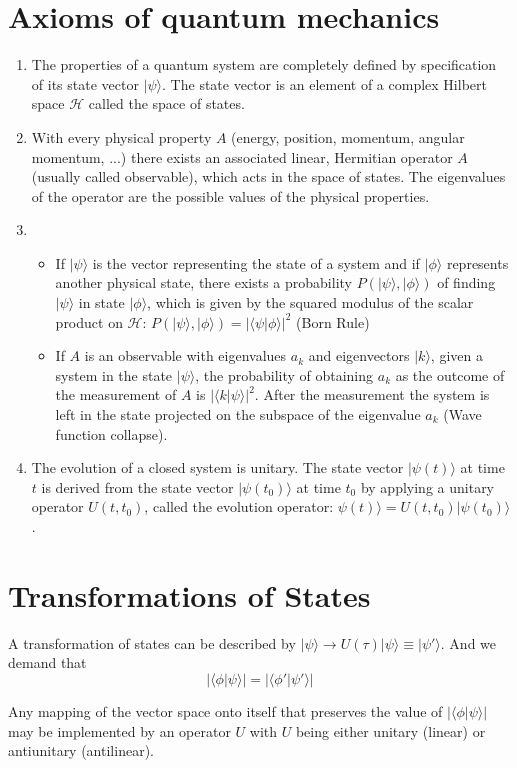 \section{Axioms of quantum mechanics}
\begin{enumerate}
\item  The properties of a quantum system are completely defined by specification of its state vector $|\psi\rangle$. The state vector is an element of a complex Hilbert space $\mathcal{H}$ called the space of states.
\item With every physical property $A$ (energy, position, momentum, angular momentum, ...) there exists an associated linear, Hermitian operator $A$ (usually called observable), which acts in the space of states. The eigenvalues of the operator are the possible values of the physical properties.
\item 
\begin{itemize}
\item  If $|\psi\rangle$ is the vector representing the state of a system and if $|\phi\rangle$ represents another physical state, there exists a probability $P(|\psi\rangle,|\phi\rangle)$ of finding $|\psi\rangle$ in state $|\phi\rangle$, which is given by the squared modulus of the scalar product on $\mathcal{H}: \, P(|\psi\rangle,|\phi\rangle) = |\langle \psi | \phi \rangle|^2$ (Born Rule)
\item If $A$ is an observable with eigenvalues $a_k$ and eigenvectors $|k\rangle$, given a system in the state $|\psi\rangle$, the probability of obtaining $a_k$ as the outcome of the measurement of $A$ is $|\langle k | \psi \rangle|^2$. After the measurement
the system is left in the state projected on the subspace of the eigenvalue $a_k$ (Wave function collapse).
\end{itemize}
\item The evolution of a closed system is unitary. The state vector $|\psi(t)\rangle$ at time $t$ is derived from the state vector $|\psi(t_0)\rangle$ at time $t_0$ by applying a unitary operator $U(t,t_0)$, called the evolution operator: $\psi(t)\rangle = U(t,t_0) |\psi(t_0)\rangle$.
\end{enumerate}

\section{Transformations of States}
A transformation of states can be described by $|\psi\rangle \to U(\tau) | \psi \rangle \equiv | \psi' \rangle$. And we demand that
\[|\langle \phi | \psi \rangle| = |\langle \phi' | \psi' \rangle|\]
\begin{newthem}
Any mapping of the vector space onto itself that preserves the value of $|\langle \phi | \psi \rangle|$ may be implemented by an operator $U$ with $U$ being either unitary (linear) or antiunitary (antilinear).
\end{newthem}

